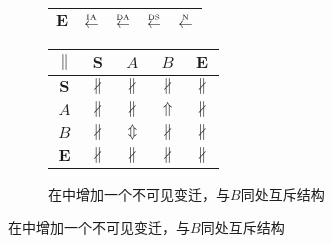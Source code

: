 \begin{figure}[htbp]
\begin{subfigure}{1\textwidth}
\begin{minipage}[b]{0.3\textwidth}
\begin{tabular}{|c|c|c|c|c|}
        $\bm{E}$ & $\overset{\text{\tiny{IA}}}{\leftarrow}$ & $\overset{\text{\tiny{DA}}}{\leftarrow}$ & $\overset{\text{\tiny{DS}}}{\leftarrow}$ & $\overset{\text{\tiny{N}}}{\leftarrow}$\\ \hline
      \end{tabular}
    \end{minipage}
    \begin{minipage}[b]{0.3\textwidth}
      \vspace{1em}
      \centering
      \begin{tabular}{|c|c|c|c|c|} \hline
        $\parallel$ & $\bm{S}$ & $A$ & $B$ & $\bm{E}$\\ \hline
        $\bm{S}$ & $\nparallel$ & $\nparallel$ & $\nparallel$ & $\nparallel$\\ \hline
        $A$ & $\nparallel$ & $\nparallel$ & $\Uparrow$ & $\nparallel$\\ \hline
        $B$ & $\nparallel$ & $\Updownarrow$ & $\nparallel$ & $\nparallel$\\ \hline
        $\bm{E}$ & $\nparallel$ & $\nparallel$ & $\nparallel$ & $\nparallel$\\ \hline
      \end{tabular}
    \end{minipage}
    \caption{在中增加一个不可见变迁，与$B$同处互斥结构}
    \label{fig:uniqueness_3_f}
  \end{subfigure}


\end{figure}
